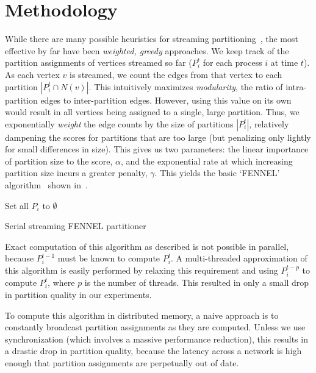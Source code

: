 \section{Methodology}
While there are many possible heuristics for streaming partitioning~\cite{Stanton:2012:SGP:2339530.2339722}, the most effective by far have been \emph{weighted, greedy} approaches. We keep track of the partition assignments of vertices streamed so far ($P_i^t$ for each process $i$ at time $t$). As each vertex $v$ is streamed, we count the edges from that vertex to each partition $|P_i^t \cap N(v)|$. This intuitively maximizes \emph{modularity}, the ratio of intra-partition edges to inter-partition edges. However, using this value on its own would result in all vertices being assigned to a single, large partition. Thus, we exponentially \emph{weight} the edge counts by the size of partitions $|P_i^t|$, relatively dampening the scores for partitions that are too large (but penalizing only lightly for small differences in size). This gives us two parameters: the linear importance of partition size to the score, $\alpha$, and the exponential rate at which increasing partition size incurs a greater penalty, $\gamma$. This yields the basic `FENNEL' algorithm~\cite{tsourakakis2012fennel} shown in~.

\begin{algorithm}
 Set all $P_i$ to $\emptyset$\;
 \caption{Serial streaming FENNEL partitioner}
 \label{alg:fennel}
\end{algorithm}

Exact computation of this algorithm as described is not possible in parallel, because $P_i^{t-1}$ must be known to compute $P_i^t$. A multi-threaded approximation of this algorithm is easily performed by relaxing this requirement and using $P_i^{t-p}$ to compute $P_i^t$, where $p$ is the number of threads. This resulted in only a small drop in partition quality in our experiments.

To compute this algorithm in distributed memory, a naive approach is to constantly broadcast partition assignments as they are computed. Unless we use synchronization (which involves a massive performance reduction), this results in a drastic drop in partition quality, because the latency across a network is high enough that partition assignments are perpetually out of date. 

